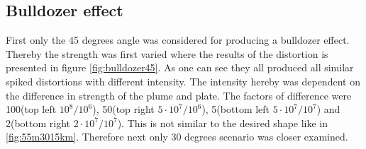 \documentclass[12pt]{scrreprt}
\begin{document}
\subsection{Bulldozer effect}
First only the 45 degrees angle was considered for producing a bulldozer effect. Thereby the strength was first varied where the results of the distortion is presented in figure \ref{fig:bulldozer45}. As one can see they all produced all similar spiked distortions with different intensity. The intensity hereby was dependent on the difference in strength of the plume and plate. The factors of difference were 100(top left $10^8/10^6$), 50(top right $5\cdot 10^7/10^6$), 5(bottom left $5\cdot 10^7/10^7$) and 2(bottom right $2\cdot 10^7/10^7$). This is not similar to the desired shape like in \ref{fig:55m3015km}. Therefore next only 30 degrees scenario was closer examined.
\end{document}
